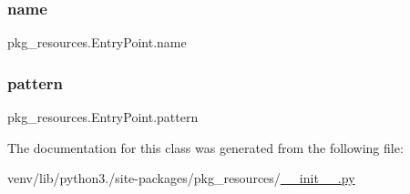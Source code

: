 \subsubsection{\texorpdfstring{name}{name}}
{\footnotesize\ttfamily pkg\+\_\+resources.\+Entry\+Point.\+name}

\mbox{\label{classpkg__resources_1_1EntryPoint_aec11de06a8c824a9b03584cecd39a1a6}} 
\subsubsection{\texorpdfstring{pattern}{pattern}}
{\footnotesize\ttfamily pkg\+\_\+resources.\+Entry\+Point.\+pattern\hspace{0.3cm}{\ttfamily [static]}}



The documentation for this class was generated from the following file\+:\begin{DoxyCompactItemize}
\item 
venv/lib/python3./site-\/packages/pkg\+\_\+resources/\hyperlink{venv_2lib_2python3_89_2site-packages_2pkg__resources_2____init_____8py}{\+\_\+\+\_\+init\+\_\+\+\_\+.\+py}\end{DoxyCompactItemize}
